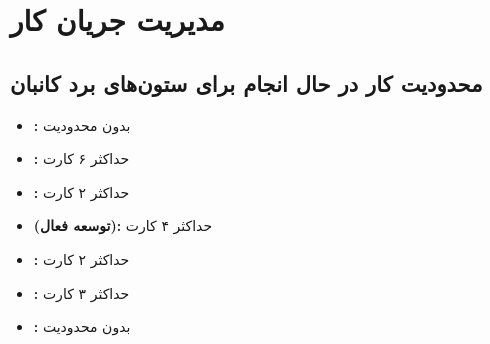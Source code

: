 \chapter{مدیریت جریان کار}


\section{محدودیت کار در حال انجام برای ستون‌های برد کانبان}
\begin{itemize}
	\item \textbf{:} بدون محدودیت
	\item \textbf{:} حداکثر ۶ کارت
	\item \textbf{:} حداکثر ۲ کارت
	\item \textbf{ (توسعه فعال):} حداکثر ۴ کارت
	\item \textbf{:} حداکثر ۲ کارت
	\item \textbf{:} حداکثر ۳ کارت
	\item \textbf{:} بدون محدودیت
\end{itemize}